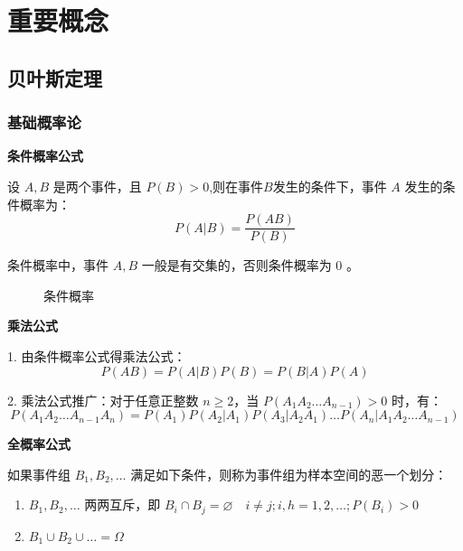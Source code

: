 \section{重要概念}

\subsection{贝叶斯定理}

\subsubsection{基础概率论}

\noindent\textbf{条件概率公式}

设 $A,B$ 是两个事件，且 $P(B)>0$,则在事件$B$发生的条件下，事件 $A$ 发生的条件概率为：
\begin{equation}
    P(A|B)=\frac{P(AB)}{P(B)}
\end{equation}

条件概率中，事件 $A,B$ 一般是有交集的，否则条件概率为 0 。

\begin{figure}[H]
    \centering
    \caption{条件概率}
\end{figure}

\noindent\textbf{乘法公式}

1. 由条件概率公式得乘法公式：
\begin{equation}
    P(AB) = P(A|B)P(B) = P(B|A)P(A)
\end{equation}

2. 乘法公式推广：对于任意正整数 $n\geq 2$，当 $P(A_1A_2\dots A_{n-1})>0$ 时，有：
\begin{equation}
    P(A_1A_2\dots A_{n-1}A_n) = P(A_1)P(A_2|A_1)P(A_3|A_2A_1) \dots P(A_n|A_1A_2\dots A_{n-1})
\end{equation}

\noindent\textbf{全概率公式}

如果事件组 $B_1,B_2,\dots$ 满足如下条件，则称为事件组为样本空间的恶一个划分：
\begin{enumerate}
    \item $B_1,B_2,\dots$ 两两互斥，即 $B_i \cap B_j = \varnothing \quad i \neq j; i,h = 1,2,\dots ; P(B_i)>0$
    \item $B_1 \cup B_2 \cup \dots = \Omega$
\end{enumerate}

